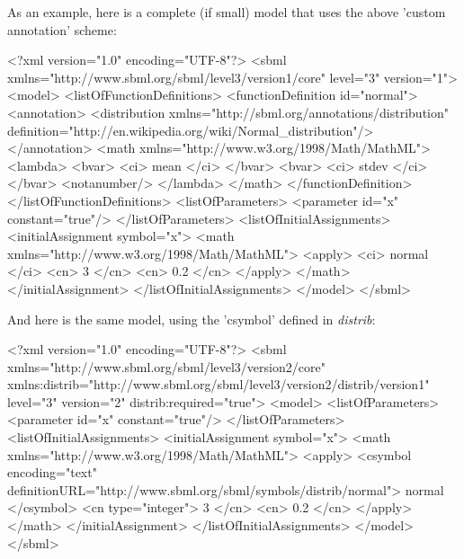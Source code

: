 \documentclass[draftspec]{sbmlpkgspec}
\newcommand{\distribshort}{\emph{distrib}\xspace}
\begin{document}
\begin{blockChanged}
As an example, here is a complete (if small) model that uses the above 'custom annotation' scheme:

\begin{example}
<?xml version="1.0" encoding="UTF-8"?>
<sbml xmlns="http://www.sbml.org/sbml/level3/version1/core"
      level="3" version="1">
  <model>
    <listOfFunctionDefinitions>
      <functionDefinition id="normal">
        <annotation>
          <distribution xmlns="http://sbml.org/annotations/distribution"
                   definition="http://en.wikipedia.org/wiki/Normal_distribution"/>
        </annotation>
        <math xmlns="http://www.w3.org/1998/Math/MathML">
          <lambda>
            <bvar>
              <ci> mean </ci>
            </bvar>
            <bvar>
              <ci> stdev </ci>
            </bvar>
            <notanumber/>
          </lambda>
        </math>
      </functionDefinition>
    </listOfFunctionDefinitions>
    <listOfParameters>
      <parameter id="x" constant="true"/>
    </listOfParameters>
    <listOfInitialAssignments>
      <initialAssignment symbol="x">
        <math xmlns="http://www.w3.org/1998/Math/MathML">
          <apply>
            <ci> normal </ci>
            <cn> 3 </cn>
            <cn> 0.2 </cn>
          </apply>
        </math>
      </initialAssignment>
    </listOfInitialAssignments>
  </model>
</sbml>

\end{example}

And here is the same model, using the 'csymbol' defined in \distribshort:

\begin{example}
<?xml version="1.0" encoding="UTF-8"?>
<sbml xmlns="http://www.sbml.org/sbml/level3/version2/core"
      xmlns:distrib="http://www.sbml.org/sbml/level3/version2/distrib/version1"
      level="3" version="2" distrib:required="true">
  <model>
    <listOfParameters>
      <parameter id="x" constant="true"/>
    </listOfParameters>
    <listOfInitialAssignments>
      <initialAssignment symbol="x">
        <math xmlns="http://www.w3.org/1998/Math/MathML">
          <apply>
            <csymbol encoding="text" definitionURL="http://www.sbml.org/sbml/symbols/distrib/normal">
                     normal </csymbol>
            <cn type="integer"> 3 </cn>
            <cn> 0.2 </cn>
          </apply>
        </math>
      </initialAssignment>
    </listOfInitialAssignments>
  </model>
</sbml>
\end{example}
\end{blockChanged}
\end{document}
